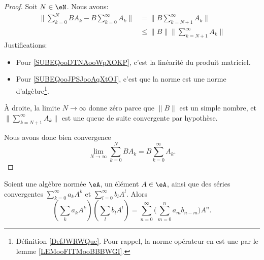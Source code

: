 \begin{proof}
    Soit \( N\in \eN\). Nous avons:
    \begin{subequations}
        \begin{align}
            \| \sum_{k=0}^NBA_k-B\sum_{k=0}^{\infty}A_k \|&=\| B\sum_{k=N+1}^{\infty}A_k \| \label{SUBEQooDTNAooWpXOKP}\\
            &\leq \| B \|\| \sum_{k=N+1}^{\infty}A_k \|     \label{SUBEQooJPSJooAqXtOJ}
        \end{align}
    \end{subequations}
    Justifications:
    \begin{itemize}
        \item Pour \eqref{SUBEQooDTNAooWpXOKP}, c'est la linéarité du produit matriciel.
        \item Pour \eqref{SUBEQooJPSJooAqXtOJ}, c'est que la norme est une norme d'algèbre\footnote{Définition \ref{DefJWRWQue}. Pour rappel, la norme opérateur en est une par le lemme \ref{LEMooFITMooBBBWGI}.}.
    \end{itemize}
    À droite, la limite \( N\to \infty\) donne zéro parce que \( \| B \|\) est un simple nombre, et \( \| \sum_{k=N+1}^{\infty}A_k \|\) est une queue de suite convergente par hypothèse.

    Nous avons donc bien convergence
    \begin{equation}
        \lim_{N\to \infty}\sum_{k=0}^{N}BA_k=B\sum_{k=0}^{\infty}A_k.
    \end{equation}
\end{proof}

\begin{proposition}      \label{PROPooFMEXooCNjdhS}
    Soient une algèbre normée \( \eA\), un élément \( A\in \eA\), ainsi que des séries convergentes \( \sum_{k=0}^{\infty}a_kA^k\) et \( \sum_{l=0}^{\infty}b_lA^l\). Alors
    \begin{equation}
        \left( \sum_ka_kA^k \right)\left( \sum_lb_lA^l \right)=\sum_{n=0}^{\infty}\big( \sum_{m=0}^na_mb_{n-m} \big)A^n.
    \end{equation}
\end{proposition}


